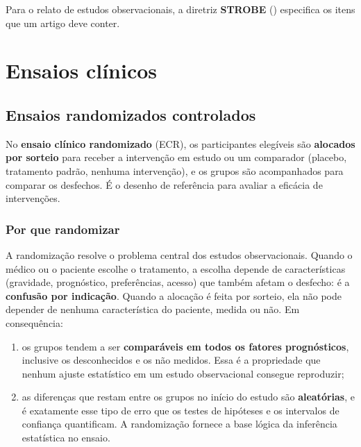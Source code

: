 \documentclass[
]{book}
\providecommand{\tightlist}{%
  \setlength{\itemsep}{0pt}\setlength{\parskip}{0pt}}
\begin{document}
Para o relato de estudos observacionais, a diretriz \textbf{STROBE} () especifica os itens que um artigo deve conter.

\section{Ensaios clínicos}\label{ensaios-cluxednicos}

\subsection{Ensaios randomizados controlados}\label{ensaios-randomizados-controlados}

No \textbf{ensaio clínico randomizado} (ECR), os participantes elegíveis são \textbf{alocados por sorteio} para receber a intervenção em estudo ou um comparador (placebo, tratamento padrão, nenhuma intervenção), e os grupos são acompanhados para comparar os desfechos. É o desenho de referência para avaliar a eficácia de intervenções.

\subsubsection{Por que randomizar}\label{por-que-randomizar}

A randomização resolve o problema central dos estudos observacionais. Quando o médico ou o paciente escolhe o tratamento, a escolha depende de características (gravidade, prognóstico, preferências, acesso) que também afetam o desfecho: é a \textbf{confusão por indicação}. Quando a alocação é feita por sorteio, ela não pode depender de nenhuma característica do paciente, medida ou não. Em consequência:

\begin{enumerate}
\def\labelenumi{\arabic{enumi}.}
\tightlist
\item
  os grupos tendem a ser \textbf{comparáveis em todos os fatores prognósticos}, inclusive os desconhecidos e os não medidos. Essa é a propriedade que nenhum ajuste estatístico em um estudo observacional consegue reproduzir;
\item
  as diferenças que restam entre os grupos no início do estudo são \textbf{aleatórias}, e é exatamente esse tipo de erro que os testes de hipóteses e os intervalos de confiança quantificam. A randomização fornece a base lógica da inferência estatística no ensaio.
\end{enumerate}
\end{document}
